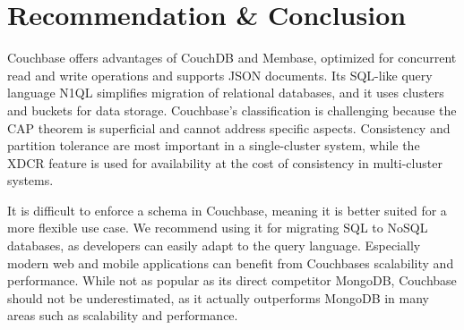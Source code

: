\section{Recommendation \& Conclusion}
Couchbase offers advantages of CouchDB and Membase, optimized for concurrent read and write operations and supports \ac{JSON} documents. Its \ac{SQL}-like query language \ac{N1QL} simplifies migration of relational databases, and it uses clusters and buckets for data storage. Couchbase's classification is challenging because the \ac{CAP} theorem is superficial and cannot address specific aspects. Consistency and partition tolerance are most important in a single-cluster system, while the \ac{XDCR} feature is used for availability at the cost of consistency in multi-cluster systems.

It is difficult to enforce a schema in Couchbase, meaning it is better suited for a more flexible use case. We recommend using it for migrating \ac{SQL} to \ac{NoSQL} databases, as developers can easily adapt to the query language. Especially modern web and mobile applications can benefit from Couchbases scalability and performance. While not as popular as its direct competitor MongoDB, Couchbase should not be underestimated, as it actually outperforms MongoDB in many areas such as scalability and performance.